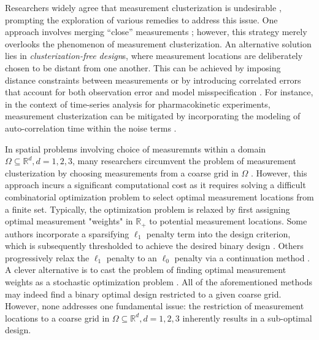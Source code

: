 Researchers widely agree that measurement clusterization is undesirable
\cite{fedorov1996, hooker2009, fedorov2012, Ucinski05,
  neitzel2019sparse}, prompting the exploration of various remedies to
address this issue. One approach involves merging ``close''
measurements \cite{fedorov2012}; however, this strategy merely
overlooks the phenomenon of measurement clusterization. An alternative
solution lies in \emph{clusterization-free design}s, where measurement
locations are deliberately chosen to be distant from one another. This
can be achieved by imposing distance constraints between measurements
or by introducing correlated errors that account for both observation
error and model misspecification \cite{Ucinski05}. For instance, in
the context of time-series analysis for pharmacokinetic experiments,
measurement clusterization can be mitigated by incorporating the modeling
of auto-correlation time within the noise terms
\cite{hooker2009}. %


In spatial problems involving choice of measuremnts within a domain
$\Omega \subseteq \mathbb{R}^d, d=1,2,3$, many researchers circumvent
the problem of measurement clusterization by choosing measurements from a
coarse grid in $\Omega$ \cite{koval2020, alexanderian2021, attia2020,
  alexanderian2014, alexanderian2016,
  alexanderian2018efficient}. However, this approach incurs a
significant computational cost as it requires solving a difficult
combinatorial optimization problem to select optimal measurement
locations from a finite set. Typically, the optimization problem is
relaxed by first assigning optimal measurement "weights" in
$\mathbb{R}_+$ to potential measurement locations. Some authors
incorporate a sparsifying $\ell_1$ penalty term into the design
criterion, which is subsequently thresholded to achieve the desired
binary design \cite{horesh2008borehole}. Others progressively relax
the $\ell_1$ penalty to an $\ell_0$ penalty via a continuation method
\cite{alexanderian2016, alexanderian2014}. A clever alternative is to
cast the problem of finding optimal measurement weights as a stochastic
optimization problem \cite{attia2022stochastic}. All of the
aforementioned methods may indeed find a binary optimal design
restricted to a given coarse grid. However, none addresses one
fundamental issue: the restriction of measurement locations to a coarse
grid in $\Omega \subseteq \mathbb{R}^d, d=1,2,3$ inherently results in
a sub-optimal design.

